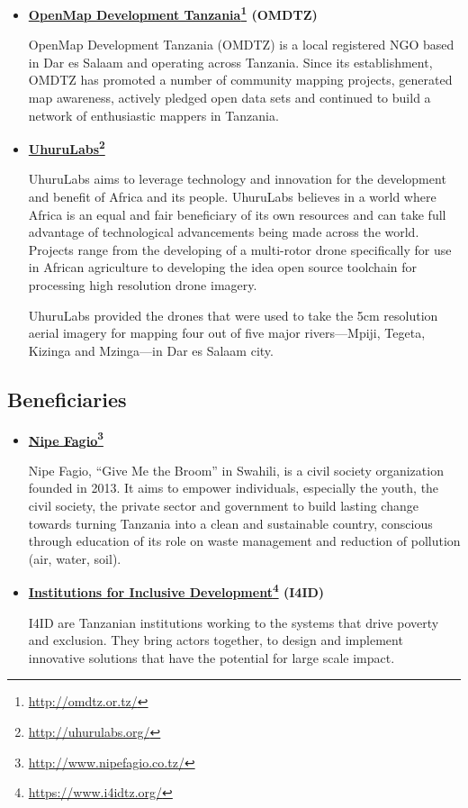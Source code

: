 \documentclass[a4paper,12pt,twoside]{article}
\begin{document}
    \begin{itemize}
        \item \textbf{\href{http://omdtz.or.tz/}{OpenMap Development Tanzania}\footnote{\url{http://omdtz.or.tz/}} (OMDTZ)} %
        
        OpenMap Development Tanzania (OMDTZ) is a local registered NGO based in Dar es Salaam and operating across Tanzania. Since its establishment, OMDTZ has promoted a number of community mapping projects, generated map awareness, actively pledged open data sets and continued to build a network of enthusiastic mappers in Tanzania.
    
        \item \textbf{\href{http://uhurulabs.org/}{UhuruLabs}\footnote{\url{http://uhurulabs.org/}}}
    
        UhuruLabs aims to leverage technology and innovation for the development and benefit of Africa and its people. UhuruLabs believes in a world where Africa is an equal and fair beneficiary of its own resources and can take full advantage of technological advancements being made across the world. Projects range from the developing of a multi-rotor drone specifically for use in African agriculture to developing the idea open source toolchain for processing high resolution drone imagery. 
    
        UhuruLabs provided the drones that were used to take the 5cm resolution aerial imagery for mapping four out of five major rivers---Mpiji, Tegeta, Kizinga and Mzinga---in Dar es Salaam city. %
    
    \end{itemize}

\subsection{Beneficiaries}

    \begin{itemize}
        \item \textbf{\href{http://www.nipefagio.co.tz/}{Nipe Fagio}\footnote{\url{http://www.nipefagio.co.tz/}}}
    
        Nipe Fagio, “Give Me the Broom” in Swahili, is a civil society organization founded in 2013. It aims to empower individuals, especially the youth, the civil society, the private sector and government to build lasting change towards turning Tanzania into a clean and sustainable country, conscious through education of its role on waste management and reduction of pollution (air, water, soil).
        
        \item \textbf{\href{https://www.i4idtz.org/}{Institutions for Inclusive Development}\footnote{\url{https://www.i4idtz.org/}} (I4ID)}
    
        I4ID are Tanzanian institutions working to the systems that drive poverty and exclusion. They bring actors together, to design and implement innovative solutions that have the potential for large scale impact.
    
    \end{itemize}
\end{document}

